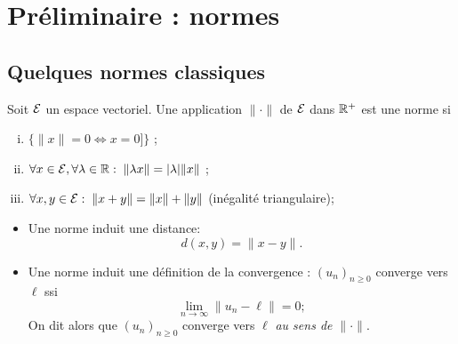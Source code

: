 \section{Préliminaire : normes} \label{sec:Multivar-Norme}

\subsection{Quelques normes classiques} 

\begin{definition*}
  Soit $\mathcal{E}$ un espace vectoriel. Une application $\|\cdot\|$ de $\mathcal{E}$ dans $\mathbb{R}^+$ est une norme si
  \begin{enumerate}[(i)]
    \item $\{\|x\| = 0 \Leftrightarrow x = 0]\}$ ;
    \item $\forall x \in \mathcal{E}, \forall \lambda \in \mathbb{R}: \; \|\lambda x\| = |\lambda| \|x\|$ ;
    \item $\forall x, y \in \mathcal{E}: \; \|x+y\| = \|x\| + \|y\|$ (inégalité triangulaire);
  \end{enumerate}
\end{definition*}

\remark
\begin{itemize}
  \item Une norme induit une distance:
  $$
  d(x, y) = \|x - y\|.
  $$
  \item Une norme induit une définition de la convergence : $(u_n)_{n \geq 0}$ converge vers $\ell$ ssi
  $$
  \lim_{n \rightarrow \infty} \|u_n - \ell\| = 0;
  $$
  On dit alors que $(u_n)_{n \geq 0}$ converge vers $\ell$ {\em au sens de $\|\cdot\|$}.
\end{itemize}

